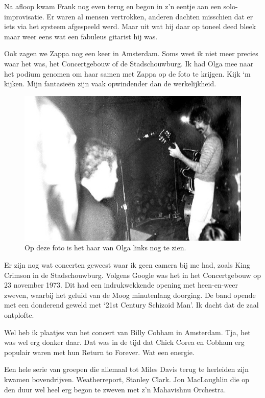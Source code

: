 \documentclass[12pt,twoside, openright]{memoir}
\begin{document}
Na afloop kwam Frank nog even terug en begon in z’n eentje aan een solo-improvisatie. Er waren al mensen vertrokken, anderen dachten misschien dat er iets via het systeem afgespeeld werd. Maar uit wat hij daar op toneel deed bleek maar weer eens wat een fabuleus gitarist hij was.

Ook zagen we Zappa nog een keer in Amsterdam. Soms weet ik niet meer precies waar het was, het Concertgebouw of de Stadschouwburg. Ik had Olga mee naar het podium genomen om haar samen met Zappa op de foto te krijgen. Kijk ‘m kijken. Mijn fantasieën zijn vaak opwindender dan de werkelijkheid.

\begin{figure}
\includegraphics[width=\textwidth]{img/ch31/zappaolga}
\caption*{\footnotesize Op deze foto is het haar van Olga links nog te zien.}
\end{figure}

Er zijn nog wat concerten geweest waar ik geen camera bij me had, zoals King Crimson in de Stadschouwburg. Volgens Google was het in het Concertgebouw op 23 november 1973. Dit had een indrukwekkende opening met heen-en-weer zweven, waarbij het geluid van de Moog minutenlang doorging. De band opende met een donderend geweld met `21st Century Schizoid Man'. Ik dacht dat de zaal ontplofte.

Wel heb ik plaatjes van het concert van Billy Cobham in Amsterdam. Tja, het was wel erg donker daar. Dat was in de tijd dat Chick Corea en Cobham erg populair waren met hun Return to Forever. Wat een energie. 

Een hele serie van groepen die allemaal tot Miles Davis terug te herleiden zijn kwamen bovendrijven. Weatherreport, Stanley Clark. Jon MacLaughlin die op den duur wel heel erg begon te zweven met z’n Mahavishnu Orchestra.
\end{document}
